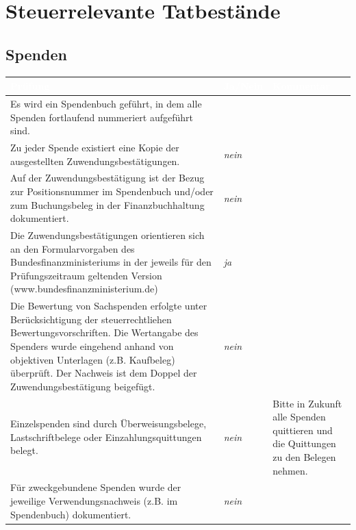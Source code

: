 \documentclass[%
	titlepage,oneside,12pt,headlines=1.5,numbers=noenddot, chapterprefix=false,parskip=full-,DIV=14,pagesize]{scrreprt}
\begin{document}
\chapter{Steuerrelevante Tatbestände}
\section{Spenden}
\begin{longtable}[ht]{|p{} p{} p{}|}
\hline\rowcolor{pirateorange} 
	\footnotesize\textcolor{white}{\textbf{Prüfung}} & \footnotesize\textcolor{white}{\textbf{Ja/Nein}} & \footnotesize\textcolor{white}{\textbf{Kommentar}}\\\endhead
        \scriptsize Es wird ein Spendenbuch  geführt, in dem alle Spenden fortlaufend nummeriert aufgeführt sind. & \scriptsize \textit{}  & \scriptsize \\ 
        \scriptsize Zu jeder Spende existiert eine Kopie der ausgestellten  Zuwendungsbestätigungen. & \scriptsize \textit{nein}	& \scriptsize \\
        \scriptsize Auf der Zuwendungsbestätigung ist der Bezug zur Positionsnummer im Spendenbuch und/oder zum Buchungsbeleg in der Finanzbuchhaltung dokumentiert. & \scriptsize \textit{nein} & \scriptsize \\
       	\scriptsize Die Zuwendungsbestätigungen orientieren sich an den Formularvorgaben des Bundesfinanzministeriums in der jeweils für den Prüfungszeitraum geltenden Version (www.bundesfinanzministerium.de) & \scriptsize \textit{ja} & \scriptsize \\
       	\scriptsize Die Bewertung von Sachspenden  erfolgte unter Berücksichtigung der steuerrechtliehen Bewertungsvorschriften. Die Wertangabe des Spenders wurde eingehend  anhand von objektiven Unterlagen (z.B. Kaufbeleg) überprüft. Der Nachweis ist dem Doppel der Zuwendungsbestätigung beigefügt. & \scriptsize \textit{nein} & \scriptsize \\
       	\scriptsize Einzelspenden  sind durch Überweisungsbelege, Lastschriftbelege oder Einzahlungsquittungen belegt. & \scriptsize \textit{nein} & \scriptsize Bitte in Zukunft alle Spenden quittieren und die Quittungen zu den Belegen nehmen.\\
        \scriptsize Für zweckgebundene Spenden wurde der jeweilige Verwendungsnachweis (z.B. im Spendenbuch) dokumentiert. & \scriptsize \textit{nein}  	& \scriptsize \\
\hline
\end{longtable}
\end{document}
